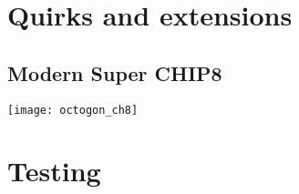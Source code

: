 \section{Quirks and extensions}
\label{sec:ch3sec4}

\subsection{Modern Super CHIP8}
\label{subsec:ch3sec4sub1}

\begin{minipage}{\linewidth}
\texttt{[image: octogon\_ch8]}
\end{minipage}

\section{Testing}
\label{sec:ch3sec5}